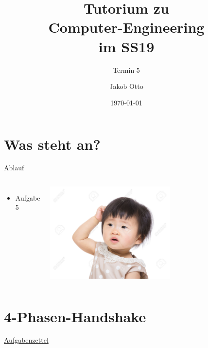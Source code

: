 \documentclass[aspectratio=169,presentation]{beamer}
\date{\today}
\newcommand{\sectionframe}[1]{
	\begin{frame}
		\vfill
		\Huge
		\centering
		\usebeamercolor[fg]{title}
		#1
		\vfill
		\par
	\end{frame}
}
\newcommand{\terminNummer}{5}
\begin{document}
\title[CE Tutorium]{Tutorium zu\\Computer-Engineering\\im SS19}
\subtitle{Termin \terminNummer}
\author[Otto]{Jakob Otto}
\subject{CE Tutorium}

\titlepage

\section{Was steht an?}
\begin{frame}{Ablauf}
	\begin{columns}
		\begin{itemize}
      \item Aufgabe 5
		\end{itemize}
		\includegraphics[width=0.6\textwidth]{kratzen}
	\end{columns}
\end{frame}


\section{4-Phasen-Handshake}
\sectionframe{\href{https://users.informatik.haw-hamburg.de/~schafers/LOCAL/S19S_CE/Aufgabenzettel_Nr5_v08.pdf}{Aufgabenzettel}}
\end{document}
